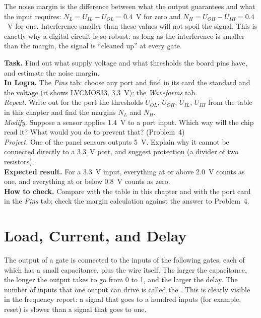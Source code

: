 The noise margin is the difference between what the output guarantees and what
the input requires: $N_L = U_{IL}-U_{OL} = 0.4$~V for zero and
$N_H = U_{OH}-U_{IH} = 0.4$~V for one. Interference smaller than these values
will not spoil the signal. This is exactly why a digital circuit is so robust: as long as the interference
is smaller than the margin, the signal is ``cleaned up'' at every gate.

\begin{diybox}
\textbf{Task.} Find out what supply voltage and what thresholds the board pins
have, and estimate the noise margin.\\
\textbf{In Logra.} The \emph{Pins} tab: choose any port and find in its
card the standard and the voltage (it shows LVCMOS33, 3.3~V); the
\emph{Waveforms} tab.\\
 \emph{Repeat.} Write out for the port the thresholds $U_{OL}$, $U_{OH}$,
$U_{IL}$, $U_{IH}$ from the table in this chapter and find the margins $N_L$ and $N_H$.\\
 \emph{Modify.} Suppose a sensor applies 1.4~V to a port input. Which
way will the chip read it? What would you do to prevent that?
(Problem~4)\\
 \emph{Project.} One of the panel sensors outputs 5~V. Explain why
it cannot be connected directly to a 3.3~V port, and suggest protection (a divider of
two resistors).\\
\textbf{Expected result.} For a 3.3~V input, everything at or above 2.0~V counts as one, and everything at or below 0.8~V
counts as zero.\\
\textbf{How to check.} Compare with the table in this chapter and with the port card in the
\emph{Pins} tab; check the margin calculation against the answer to Problem~4.
\end{diybox}

\section{Load, Current, and Delay}

The output of a gate is connected to the inputs of the following gates, each of which
has a small capacitance, plus the wire itself. The larger the capacitance, the longer the output
takes to go from 0 to 1, and the larger the delay. The number of inputs that one output can
drive is called the . This
is clearly visible in the frequency report: a signal that goes to a hundred inputs (for example,
reset) is slower than a signal that goes to one.

